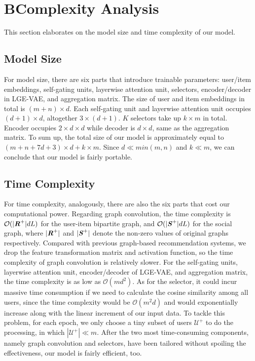 \documentclass[letterpaper]{article} %
\begin{document}
\section{B{\quad}Complexity Analysis}
This section elaborates on the model size and time complexity of our model.
\subsection{Model Size}
For model size, there are six parts that introduce trainable parameters: user/item embeddings, self-gating units, layerwise attention unit, selectors, encoder/decoder in LGE-VAE, and aggregation matrix. The size of user and item embeddings in total is $(m+n)\times d$. Each self-gating unit and layerwise attention unit occupies $(d+1)\times d$, altogether $3\times (d+1)$. $K$ selectors take up $k\times m$ in total. Encoder occupies $2\times d\times d$ while decoder is $d\times d$, same as the aggregation matrix. To sum up, the total size of our model is approximately equal to $(m+n+7d+3)\times d+ k\times m$. Since $d\ll min(m,n)$ and $k\ll m$, we can conclude that our model is fairly portable.
\subsection{Time Complexity}
For time complexity, analogously, there are also the six parts that cost our computational power. Regarding graph convolution, the time complexity is $\mathcal{O}(|\textbf{\textit{R}}^+|dL)$ for the user-item bipartite graph, and $\mathcal{O}(|\textbf{\textit{S}}^+|dL)$ for the social graph, where $|\textbf{\textit{R}}^+|$ and $|\textbf{\textit{S}}^+|$ denote the non-zero values of original graphs respectively. Compared with previous graph-based recommendation systems, we drop the feature transformation matrix and activation function, so the time complexity of graph convolution is relatively slower. For the self-gating units, layerwise attention unit, encoder/decoder of LGE-VAE, and aggregation matrix, the time complexity is as low as $\mathcal{O}(md^2)$. As for the selector, it could incur massive time consumption if we need to calculate the cosine similarity among all users, since the time complexity would be $\mathcal{O}(m^2d)$ and would exponentially increase along with the linear increment of our input data. To tackle this problem, for each epoch, we only choose a tiny subset of users $\mathcal{U}^+$ to do the processing, in which $|\mathcal{U}^+| \ll m$. After the two most time-consuming components, namely graph convolution and selectors, have been tailored without spoiling the effectiveness, our model is fairly efficient, too.
\end{document}
